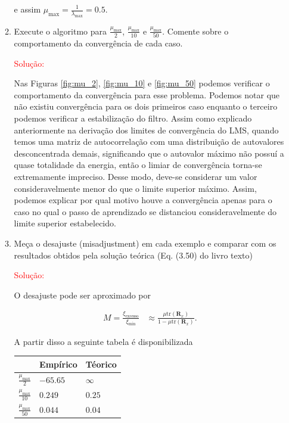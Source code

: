 \documentclass[a4paper,10pt]{article}
\begin{document}
\begin{enumerate}
\begin{enumerate}
						e assim $\mu_{\text{max}} = \frac{1}{\lambda_{\text{max}}} = 0.5$.

					\item Execute o algoritmo para $\frac{\mu_{\text{max}}}{2}$, $\frac{\mu_{\text{max}}}{10}$ e $\frac{\mu_{\text{max}}}{50}$. Comente sobre o comportamento da convergência de cada caso.
						
						\textcolor{red}{Solução:}

						Nas Figuras \ref{fig:mu_2}, \ref{fig:mu_10} e \ref{fig:mu_50} podemos verificar o comportamento da convergência para esse problema. Podemos notar que não existiu convergência para
						os dois primeiros caso enquanto o terceiro podemos verificar a estabilização do filtro. Assim como explicado anteriormente na derivação dos limites de convergência do LMS, quando temos
						uma matriz de autocorrelação com uma distribuição de autovalores desconcentrada demais, significando que o autovalor máximo não possuí a quase totalidade da energia, então o limiar de convergência
						torna-se extremamente impreciso. Desse modo, deve-se considerar um valor consideravelmente menor do que o limite superior máximo. Assim, podemos explicar por qual motivo houve a convergência apenas 
						para o caso no qual o passo de aprendizado se distanciou consideravelmente do limite superior estabelecido.

					\item Meça o desajuste (misadjustment) em cada exemplo e comparar com os resultados obtidos pela solução teórica (Eq. (3.50) do livro texto)					

						\textcolor{red}{Solução:}

						O desajuste pode ser aproximado por

						\begin{align}
							M = \frac{\xi_{\text{excesso}}}{\xi_{\text{min}}} &\approx \frac{\mu \text{tr}(\mathbf{R}_{x})}{1 - \mu \text{tr}(\mathbf{R}_{x})}.
						\end{align}

						A partir disso a seguinte tabela é disponibilizada 

						\begin{table}[!ht]
							\centering
							\begin{tabular}{|l|l|l|}
								\hline
							 	& Empírico & Téorico \\ \hline
							 	$\frac{\mu_{\text{max}}}{2}$ & $-65.65$ &  $\infty$ \\ \hline
							 	$\frac{\mu_{\text{max}}}{10}$ & $0.249$ & $0.25$ \\ \hline
							 	$\frac{\mu_{\text{max}}}{50}$ & $0.044$ & $0.04 $ \\ \hline
							\end{tabular}
						\end{table}


\end{enumerate}
\end{enumerate}
\end{document}

